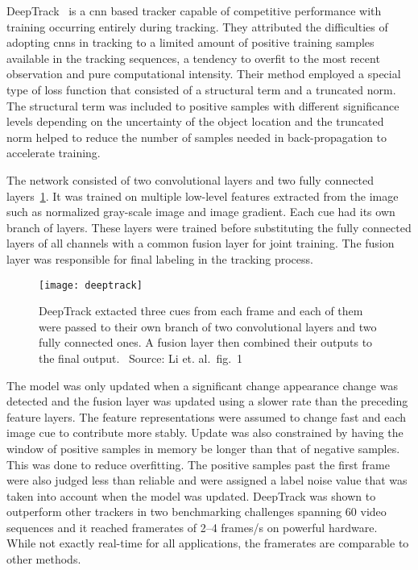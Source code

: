 DeepTrack~\cite{DEEPTRACK} is a \ac{cnn} based tracker capable of competitive performance
with training occurring entirely during tracking. They attributed the difficulties of
adopting \ac{cnn}s in tracking to a limited amount of positive training samples available
in the tracking sequences, a tendency to overfit to the most recent observation and pure
computational intensity. Their method employed a special type of loss function that
consisted of a structural term and a truncated norm. The structural term was included
to positive samples with different significance levels depending on the uncertainty of
the object location and the truncated norm helped to reduce the number of samples needed
in back-propagation to accelerate training.~\cite{DEEPTRACK}

The network consisted of two convolutional layers and two fully connected layers~\ref{fig:deeptrack}.
It was trained on multiple low-level features extracted from the image such as normalized
gray-scale image and image gradient. Each cue had its own branch of layers. These
layers were trained before substituting the fully connected layers of all channels
with a common fusion layer for joint training. The fusion layer was responsible for
final labeling in the tracking process.~\cite{DEEPTRACK}

\begin{figure}[H]
\centering
\texttt{[image: deeptrack]}
\caption{DeepTrack extacted three cues from each frame and each of them were passed
         to their own branch of two convolutional layers and two fully connected ones.
         A fusion layer then combined their outputs to the final output.~\cite{DEEPTRACK} Source: Li et.
         al.~fig.~1~\cite{DEEPTRACK}}\label{fig:deeptrack}
\end{figure}

The model was only updated when a significant change appearance change was detected
and the fusion layer was updated using a slower rate than the preceding feature layers.
The feature representations were assumed to change fast and each image cue to contribute
more stably. Update was also constrained by having the window of positive samples in
memory be longer than that of negative samples. This was done to reduce overfitting.
The positive samples past the first frame were also judged less than reliable and
were assigned a label noise value that was taken into account when the model was updated.
DeepTrack was shown to outperform other trackers in two benchmarking challenges
spanning 60 video sequences and it reached framerates of 2--4 frames/s on powerful
hardware.~\cite{DEEPTRACK} While not exactly real-time for all applications, the framerates are comparable
to other methods.

